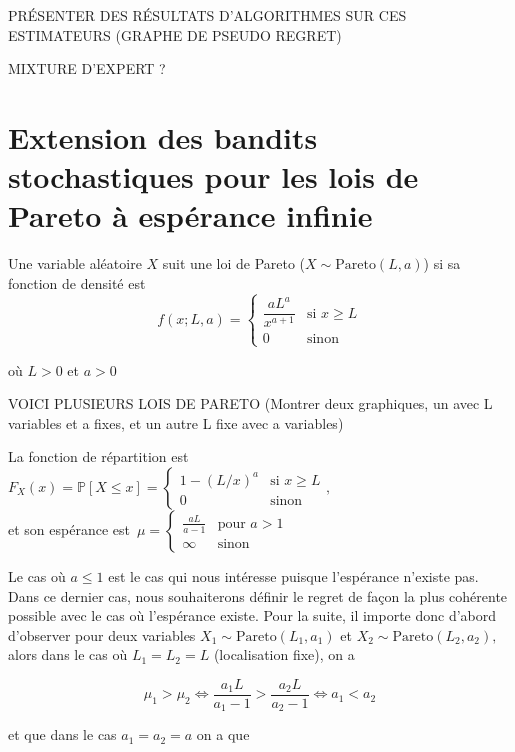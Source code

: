 \documentclass{article}
\renewcommand{\P}[1]{\mathbb{P}\left[ #1 \right]}
\begin{document}
PRÉSENTER DES RÉSULTATS D'ALGORITHMES SUR CES ESTIMATEURS (GRAPHE DE PSEUDO REGRET)

MIXTURE D'EXPERT ?

\section{Extension des bandits stochastiques pour les lois de Pareto à espérance infinie}

Une variable aléatoire $X$ suit une loi de Pareto ($X\sim\mathrm{Pareto}(L,a)$) si sa fonction de densité est 
\begin{equation}
f(x;L,a)=\left\{
\begin{array}{ll}
\dfrac{aL^a}{x^{a+1}} & \text{si $x\geq L$}\\[0.2cm]
0                       & \text{sinon}
\end{array}
\right.
\end{equation}

où $L>0$ et $a>0$

VOICI PLUSIEURS LOIS DE PARETO (Montrer deux graphiques, un avec L variables et a fixes, et un autre L fixe avec a variables)

La fonction de répartition est 
$F_X(x)=\P{X\leq x}=\left\{
\begin{array}{ll}
1-(L/x)^a & \text{si } x\geq L\\
0					 & \text{sinon}
\end{array}
\right.
,$
\\
et son espérance \mbox{est 
$\mu=\left\{\begin{array}{ll}
\frac{aL}{a-1} & \text{pour } a>1\\
\infty              & \text{sinon}
\end{array}
\right.
$ 
}

Le cas où $a\leq 1$ est le cas qui nous intéresse puisque l'espérance n'existe pas. Dans ce dernier cas, nous souhaiterons définir le regret de façon la plus cohérente possible avec le cas où l'espérance existe. Pour la suite, il importe donc d'abord d'observer pour deux variables $X_1\sim\mathrm{Pareto}(L_1,a_1)$ et $X_2\sim\mathrm{Pareto}(L_2,a_2),$ alors dans le cas où $L_1=L_2=L$ (localisation fixe), on a 

\begin{equation}\label{dom moy: L constant}
\mu_1>\mu_2 \Leftrightarrow \frac{a_1L}{a_1-1}>\frac{a_2L}{a_2-1} \Leftrightarrow a_1<a_2
\end{equation}

et que dans le cas $a_1=a_2=a$ on a que
\end{document}
